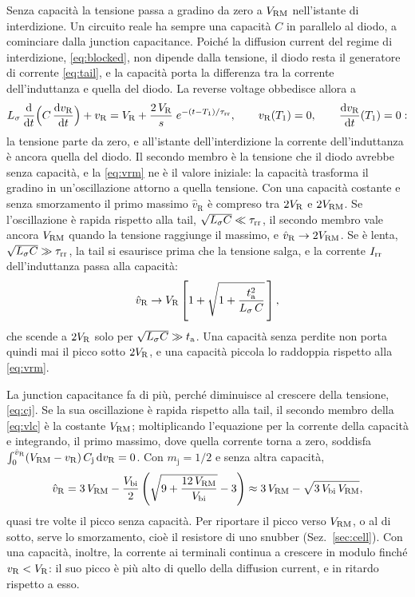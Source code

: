 \documentclass[10pt,a4paper]{scrartcl}
\let\newcommand\pdvaluedefine
\newcommand{\VR}{V_\mathrm{R}}
\newcommand{\Irr}{I_\mathrm{rr}}
\newcommand{\ta}{t_\mathrm{a}}
\newcommand{\taurr}{\tau_\mathrm{rr}}
\newcommand{\Tone}{T_1}
\newcommand{\Cj}{C_\mathrm{j}}
\newcommand{\Vrm}{V_\mathrm{RM}}
\newcommand{\diff}{\mathrm{d}}
\newcommand{\Ls}{L_\sigma}                    %
\newcommand{\Vbi}{V_\mathrm{bi}}
\begin{document}
Senza capacità la tensione passa a gradino da zero a $\Vrm$ nell'istante di interdizione. Un circuito reale ha sempre una capacità $C$ in parallelo al diodo, a cominciare dalla junction capacitance. Poiché la diffusion current del regime di interdizione, \eqref{eq:blocked}, non dipende dalla tensione, il diodo resta il generatore di corrente \eqref{eq:tail}, e la capacità porta la differenza tra la corrente dell'induttanza e quella del diodo. La reverse voltage obbedisce allora a
\begin{equation}
\Ls\,\frac{\diff}{\diff t}\Bigl(C\,\frac{\diff v_\mathrm{R}}{\diff t}\Bigr) + v_\mathrm{R} = \VR + \frac{2\,\VR}{s}\;e^{-(t-\Tone)/\taurr} , \qquad v_\mathrm{R}(\Tone) = 0 , \qquad \frac{\diff v_\mathrm{R}}{\diff t}(\Tone) = 0 :
\label{eq:vlc}
\end{equation}
la tensione parte da zero, e all'istante dell'interdizione la corrente dell'induttanza è ancora quella del diodo. Il secondo membro è la tensione che il diodo avrebbe senza capacità, e la \eqref{eq:vrm} ne è il valore iniziale: la capacità trasforma il gradino in un'oscillazione attorno a quella tensione. Con una capacità costante e senza smorzamento il primo massimo $\hat v_\mathrm{R}$ è compreso tra $2\VR$ e $2\Vrm$. Se l'oscillazione è rapida rispetto alla tail, $\sqrt{\Ls C} \ll \taurr$, il secondo membro vale ancora $\Vrm$ quando la tensione raggiunge il massimo, e $\hat v_\mathrm{R} \to 2\Vrm$. Se è lenta, $\sqrt{\Ls C} \gg \taurr$, la tail si esaurisce prima che la tensione salga, e la corrente $\Irr$ dell'induttanza passa alla capacità:
\begin{equation}
\hat v_\mathrm{R} \to \VR\left[1 + \sqrt{1 + \frac{\ta^2}{\Ls\,C}}\,\right] ,
\label{eq:vpkslow}
\end{equation}
che scende a $2\VR$ solo per $\sqrt{\Ls C} \gg \ta$. Una capacità senza perdite non porta quindi mai il picco sotto $2\VR$, e una capacità piccola lo raddoppia rispetto alla \eqref{eq:vrm}.

La junction capacitance fa di più, perché diminuisce al crescere della tensione, \eqref{eq:cj}. Se la sua oscillazione è rapida rispetto alla tail, il secondo membro della \eqref{eq:vlc} è la costante $\Vrm$; moltiplicando l'equazione per la corrente della capacità e integrando, il primo massimo, dove quella corrente torna a zero, soddisfa $\int_0^{\hat v_\mathrm{R}} (\Vrm - v_\mathrm{R})\,\Cj\,\diff v_\mathrm{R} = 0$. Con $m_\mathrm{j} = 1/2$ e senza altra capacità,
\begin{equation}
\hat v_\mathrm{R} = 3\,\Vrm - \frac{\Vbi}{2}\left(\sqrt{9 + \frac{12\,\Vrm}{\Vbi}} - 3\right) \approx 3\,\Vrm - \sqrt{3\,\Vbi\,\Vrm} ,
\label{eq:vpkcj}
\end{equation}
quasi tre volte il picco senza capacità. Per riportare il picco verso $\Vrm$, o al di sotto, serve lo smorzamento, cioè il resistore di uno snubber (Sez.~\ref{sec:cell}). Con una capacità, inoltre, la corrente ai terminali continua a crescere in modulo finché $v_\mathrm{R} < \VR$: il suo picco è più alto di quello della diffusion current, e in ritardo rispetto a esso.
\end{document}
